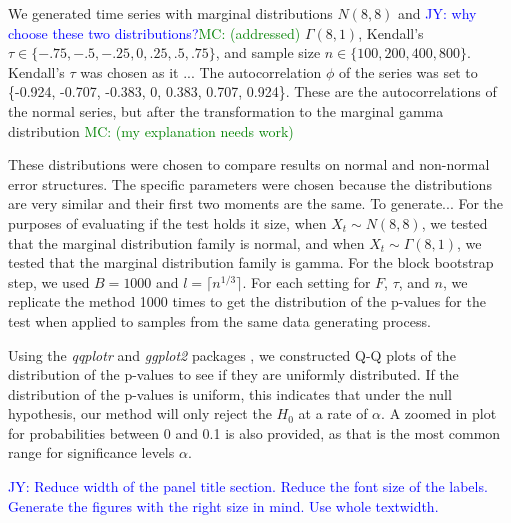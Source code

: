 \documentclass[12pt, titlepage, letterpaper]{article}
\newcommand{\jy}[1]{\textcolor{blue}{JY: #1}}
\newcommand{\mc}[1]{\textcolor{green}{MC: (#1)}}
\begin{document}
{We generated time series with marginal distributions $N(8, 8)$ and
\jy{why choose these two distributions?}\mc{addressed}
$\Gamma(8, 1)$, Kendall's $\tau \in \{-.75, -.5, -.25, 0, .25, .5, 
.75\}$, and
sample size $n \in \{100, 200, 400, 800\}$. Kendall's $\tau$ was chosen as
it ...
The autocorrelation $\phi$ of the series was set to \{-0.924, -0.707, 
-0.383, 0, 0.383, 0.707, 0.924\}. These
are the autocorrelations of the normal series, but after the transformation
to the marginal gamma distribution
\mc{my explanation needs work}


These distributions
were chosen to compare results on normal and non-normal
error structures. The specific parameters were chosen because the distributions 
are very similar and their
first two moments are the same.  To generate...
For the purposes of 
evaluating if the test holds it size, when $X_t \sim N(8, 8)$, we tested that the 
marginal distribution family is normal, and when $X_t \sim \Gamma(8, 1)$, we tested
that the marginal distribution family is gamma. For the block bootstrap step,
we used $B = 1000$ and $l = \lceil n^{1/3} \rceil$.
For each setting for $F$, $\tau$, and $n$, we replicate the method 1000 times 
to get the distribution of the p-values 
for the test when applied to samples from the same data generating process.


Using the \textsl{qqplotr} and \textsl{ggplot2} packages 
\citep{qqplotr, ggplot2},
we constructed Q-Q plots of the distribution of the p-values to see if they are
uniformly distributed. If the distribution of the p-values is uniform, this 
indicates that under the null hypothesis, our method will only reject the $H_0$
at a rate of $\alpha$.
A zoomed in plot for probabilities between 0 and 0.1 is
also provided, as
that is the most common range for significance levels $\alpha$. 

\jy{Reduce width of  the panel title section. Reduce the font size of the
  labels. Generate the figures with the right size in mind. Use whole textwidth.}
  
}
\end{document}
